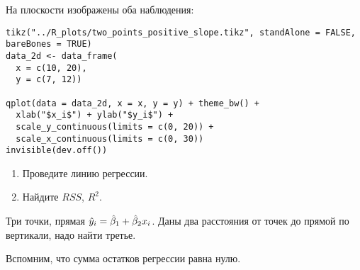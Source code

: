 \begin{problem}
На плоскости изображены оба наблюдения:

\begin{verbatim}
tikz("../R_plots/two_points_positive_slope.tikz", standAlone = FALSE, bareBones = TRUE)
data_2d <- data_frame(
  x = c(10, 20),
  y = c(7, 12))

qplot(data = data_2d, x = x, y = y) + theme_bw() +
  xlab("$x_i$") + ylab("$y_i$") +
  scale_y_continuous(limits = c(0, 20)) +
  scale_x_continuous(limits = c(0, 30))
invisible(dev.off())
\end{verbatim}



\begin{minipage}{0.6\textwidth}
\begin{center}
\begin{tikzpicture}[scale = 0.025]

\end{tikzpicture}
\end{center}
\end{minipage}

\begin{enumerate}
\item Проведите линию регрессии.
\item Найдите $RSS$, $R^2$.
\end{enumerate}

\begin{sol}
\end{sol}
\end{problem}


\begin{problem}
Три точки, прямая $\hy_i = \hb_1 + \hb_2 x_i$. Даны два расстояния от точек до прямой по вертикали, надо найти третье.
\begin{sol}
Вспомним, что сумма остатков регрессии равна нулю.
\end{sol}
\end{problem}

